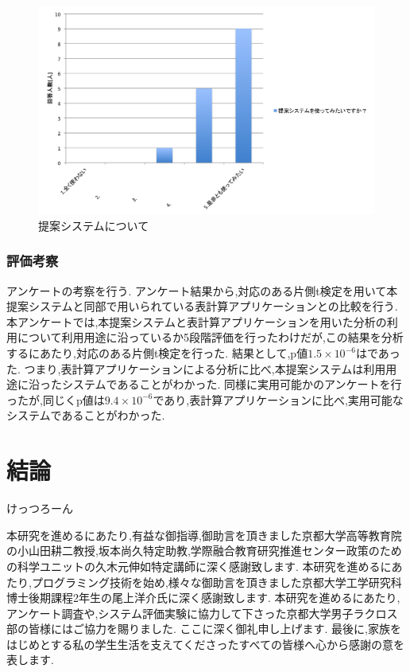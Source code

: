 \documentclass[sotsuron]{kuee}
\begin{document}
			\begin{figure}
				\begin{center}
					\includegraphics[width=\linewidth]{./png/result08.png}
				\end{center}
				\caption{提案システムについて}
		  		\label{fig:result08}
			\end{figure}
		\subsection{評価考察}
			アンケートの考察を行う. 
			アンケート結果から,対応のある片側t検定を用いて本提案システムと同部で用いられている表計算アプリケーションとの比較を行う. 
			本アンケートでは,本提案システムと表計算アプリケーションを用いた分析の利用について利用用途に沿っているか5段階評価を行ったわけだが,この結果を分析するにあたり,対応のある片側t検定を行った. 
			結果として,p値$1. 5 \times 10^{-6}$はであった. つまり,表計算アプリケーションによる分析に比べ,本提案システムは利用用途に沿ったシステムであることがわかった. 
			同様に実用可能かのアンケートを行ったが,同じくp値は$9. 4 \times 10^{-6}$であり,表計算アプリケーションに比べ,実用可能なシステムであることがわかった. 

\chapter{結論}
けっつろーん


\begin{acknowledgements}
	本研究を進めるにあたり,有益な御指導,御助言を頂きました京都大学高等教育院の小山田耕二教授,坂本尚久特定助教,学際融合教育研究推進センター政策のための科学ユニットの久木元伸如特定講師に深く感謝致します. 
	本研究を進めるにあたり,プログラミング技術を始め,様々な御助言を頂きました京都大学工学研究科博士後期課程2年生の尾上洋介氏に深く感謝致します. 
	本研究を進めるにあたり,アンケート調査や,システム評価実験に協力して下さった京都大学男子ラクロス部の皆様にはご協力を賜りました. ここに深く御礼申し上げます. 
	最後に,家族をはじめとする私の学生生活を支えてくださったすべての皆様へ心から感謝の意を表します. 
\end{acknowledgements}
\end{document}

